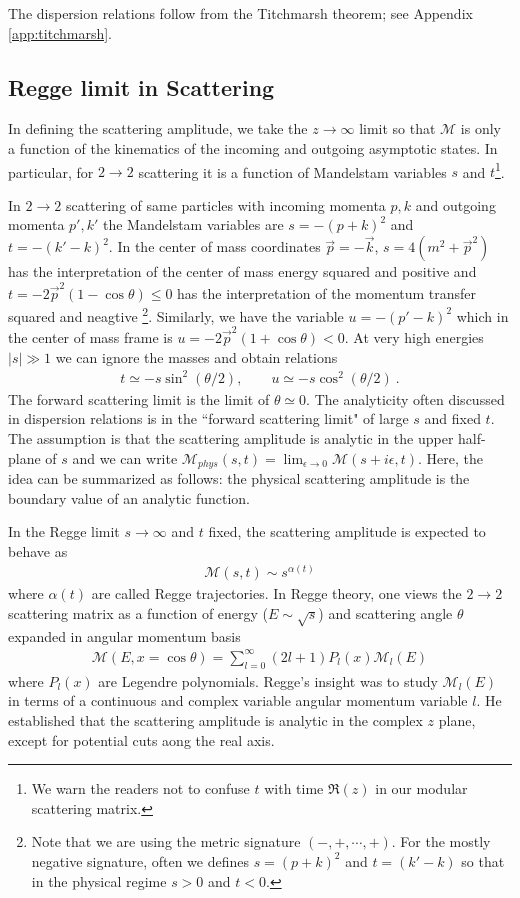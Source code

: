 \documentclass[a4paper,11pt]{article}
\theoremstyle{definition}
\newcommand{\ep}{\epsilon}
\newcommand{\mM}{\mathcal{M}}
\begin{document}
The dispersion relations follow from the Titchmarsh theorem; see Appendix \ref{app:titchmarsh}. 

\subsection{Regge limit in Scattering}
In defining the scattering amplitude, we take the $z\to \infty$ limit so that $\mathcal{M}$ is only a function of the kinematics of the incoming and outgoing asymptotic states. In particular, for $2\to 2$ scattering it is a function of Mandelstam variables $s$ and $t$\footnote{We warn the readers not to confuse $t$ with time $\Re(z)$ in our modular scattering matrix.}. 

In $2\to 2$ scattering of same particles with incoming momenta $p,k$ and outgoing momenta $p',k'$ the Mandelstam variables are $s=-(p+k)^2$ and $t=-(k'-k)^2$. In the center of mass coordinates $\vec{p}=-\vec{k}$, $s=4(m^2+\vec{p}^2)$ has the interpretation of the center of mass energy squared and positive and $t=-2\vec{p}^2(1-\cos\theta)\leq 0$ has the interpretation of the momentum transfer squared and neagtive \footnote{Note that we are using the  metric signature $(-,+,\cdots , +)$. For the mostly negative signature, often we defines $s=(p+k)^2$ and $t=(k'-k)$ so that in the physical regime $s>0$ and $t<0$.}. Similarly, we have the variable $u=-(p'-k)^2$ which in the center of mass frame is $u=-2\vec{p}^2(1+\cos\theta)<0$. At very high energies $|s|\gg 1$ we can ignore the masses and obtain relations
\begin{eqnarray}
    t\simeq -s \sin^2(\theta/2), \qquad u\simeq -s \cos^2(\theta/2)\ .
\end{eqnarray}
The forward scattering limit is the limit of $\theta\simeq 0$. The analyticity often discussed in dispersion relations is in the ``forward scattering limit" of large $s$ and fixed $t$. The assumption is that the scattering amplitude is analytic in the upper half-plane of $s$ and we can write $\mathcal{M}_{phys}(s,t)=\lim_{\ep\to 0}\mathcal{M}(s+i\ep, t)$. Here, the idea can be summarized as follows: the physical scattering amplitude is the boundary value of an analytic function.



In the Regge limit $s\to \infty$ and $t$ fixed, the scattering amplitude is expected to behave as 
\begin{eqnarray}
    \mM(s,t)\sim s^{\alpha(t)}
\end{eqnarray}
where $\alpha(t)$ are called Regge trajectories.
In Regge theory, one views the $2\to 2$ scattering matrix as a function of energy ($E\sim \sqrt{s}$) and scattering angle $\theta$ expanded in angular momentum basis
\begin{eqnarray}
    \mM(E,x=\cos\theta)=\sum_{l=0}^\infty(2l+1)P_l(x)\mM_l(E) 
\end{eqnarray}
where $P_l(x)$ are Legendre polynomials. 
Regge's insight was to study $\mM_l(E)$ in terms of a continuous and complex variable angular momentum variable $l$. He established that the scattering amplitude is analytic in the complex $z$ plane, except for potential cuts aong the real axis.
\end{document}
